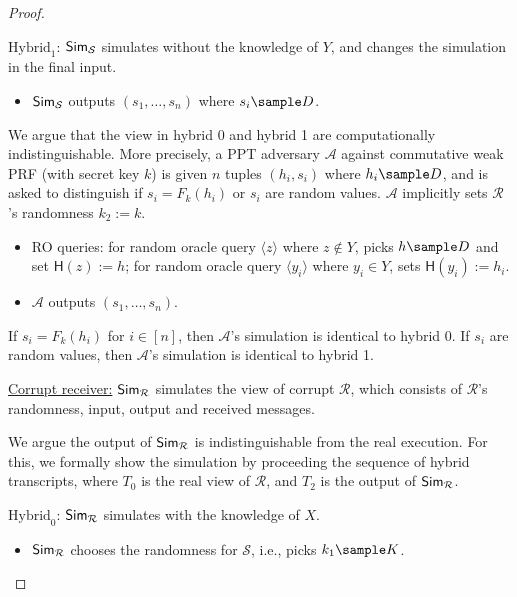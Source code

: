 \begin{proof}
\begin{trivlist}
\item $\text{Hybrid}_1$: $\mathsf{Sim}_\mathcal{S}$ simulates without the knowledge of $Y$, 
    and changes the simulation in the final input.  
\begin{itemize}
    \item $\mathsf{Sim}_\mathcal{S}$ outputs $(s_1, \dots, s_n)$ where $s_i \sample D$.       
\end{itemize}
We argue that the view in hybrid 0 and hybrid 1 are computationally indistinguishable. 
More precisely, a PPT adversary $\mathcal{A}$  
against commutative weak PRF (with secret key $k$) is given $n$ tuples $(h_i, s_i)$ where $h_i \sample D$, 
and is asked to distinguish if $s_i = F_k(h_i)$ or $s_i$ are random values. 
$\mathcal{A}$ implicitly sets $\mathcal{R}$'s randomness $k_2:=k$. 
\begin{itemize}
    \item RO queries: for random oracle query $\langle z \rangle$ where $z \notin Y$,  
        picks $h \sample D$ and set $\mathsf{H}(z):=h$; for random oracle query $\langle y_i \rangle$ where $y_i \in Y$, 
        sets $\mathsf{H}(y_i):=h_i$.  

    \item $\mathcal{A}$ outputs $(s_1, \dots, s_n)$.      
\end{itemize}

If $s_i = F_k(h_i)$ for $i \in [n]$, then $\mathcal{A}$'s simulation is identical to hybrid 0. 
If $s_i$ are random values, then $\mathcal{A}$'s simulation is identical to hybrid 1. 
\end{trivlist}

\begin{trivlist}
\item \underline{Corrupt receiver:} $\mathsf{Sim}_\mathcal{R}$ simulates the view of corrupt $\mathcal{R}$, 
    which consists of $\mathcal{R}$'s randomness, input, output and received messages.
 
    We argue the output of $\mathsf{Sim}_\mathcal{R}$ is indistinguishable from the real execution. 
    For this, we formally show the simulation by proceeding the sequence of hybrid transcripts, 
    where $T_0$ is the real view of $\mathcal{R}$, and $T_2$ is the output of $\mathsf{Sim}_\mathcal{R}$. 

\item $\text{Hybrid}_0$: $\mathsf{Sim}_\mathcal{R}$ simulates with the knowledge of $X$. 
\begin{itemize}
    \item $\mathsf{Sim}_\mathcal{R}$ chooses the randomness for $\mathcal{S}$, i.e., picks $k_1 \sample K$.
    

\end{itemize}
\end{trivlist}
\end{proof}
